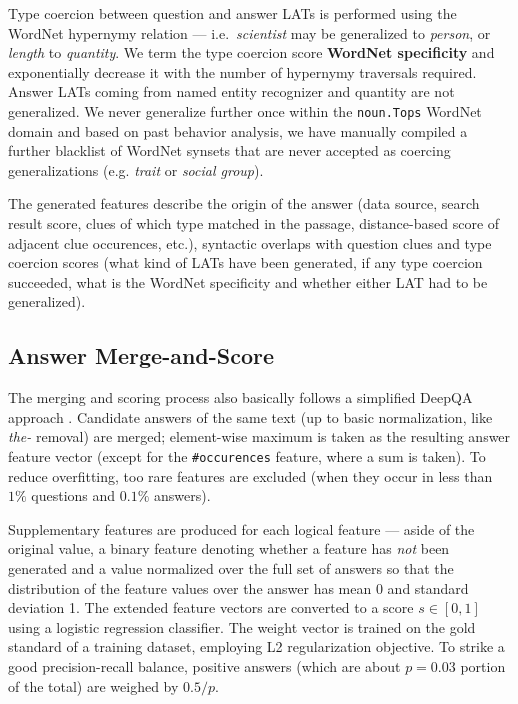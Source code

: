 Type coercion between question and answer LATs is performed using the WordNet
hypernymy relation --- i.e.\ \textit{scientist} may be generalized to \textit{person}, or \textit{length} to \textit{quantity}.
We term the type coercion score \textbf{WordNet specificity} and exponentially decrease it
with the number of hypernymy traversals required.
Answer LATs coming from named entity recognizer and quantity are not generalized.
We never generalize further once within the \texttt{noun.Tops} WordNet domain and
based on past behavior analysis, we have manually compiled a further blacklist
of WordNet synsets that are never accepted as coercing generalizations
(e.g. \textit{trait} or \textit{social group}).

The generated features describe the origin of the answer (data source, search result score, clues of which type matched in the passage, distance-based score of adjacent clue occurences, etc.), syntactic overlaps with question clues and type coercion scores (what kind of LATs have been generated, if any type coercion succeeded, what is the WordNet specificity and whether either LAT had to be generalized).

\subsection{Answer Merge-and-Score}

The merging and scoring process also basically follows a simplified DeepQA approach \citep{WatsonScoring}.
Candidate answers of the same text (up to basic normalization, like \textit{the-} removal) are merged;
element-wise maximum is taken as the resulting answer feature vector
(except for the \texttt{\#occurences} feature, where a sum is taken).
To reduce overfitting, too rare features are excluded
(when they occur in less than $1\%$ questions and $0.1\%$ answers).

Supplementary features are produced for each logical feature --- aside of the original value,
a binary feature denoting whether a feature has \textit{not} been generated
and a value normalized over the full set of answers
so that the distribution of the feature values over the answer
has mean 0 and standard deviation 1.
The extended feature vectors are converted to a score $s \in [0,1]$
using a logistic regression classifier.
The weight vector is trained on the gold standard of a training dataset,
employing L2 regularization objective.  To strike a good precision-recall
balance, positive answers (which are about $p=0.03$ portion of the total)
are weighed by $0.5/p$.

